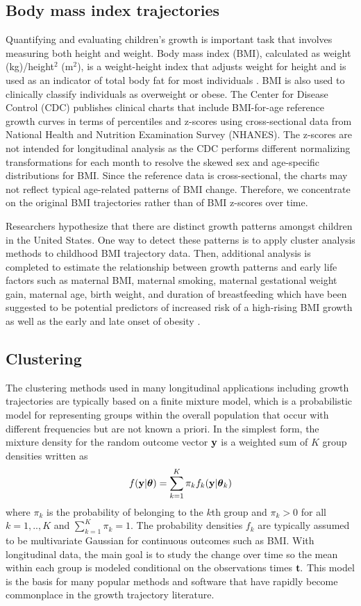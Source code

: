 \subsection{Body mass index trajectories}
Quantifying and evaluating children's growth is important task that involves measuring both height and weight. Body mass index (BMI), calculated as weight (kg)/height$^{2}$ (m$^{2}$), is a weight-height index that adjusts weight for height and is  used as an indicator of total body fat for most individuals \cite{roche1981}. BMI is also used to clinically classify individuals as overweight or obese. The Center for Disease Control (CDC) publishes clinical charts that include BMI-for-age reference growth curves in terms of percentiles and z-scores using cross-sectional data from National Health and Nutrition Examination Survey (NHANES). The z-scores are not intended for longitudinal analysis as the CDC performs different normalizing transformations for each month to resolve the skewed sex and age-specific distributions for BMI. Since the reference data is cross-sectional, the charts may not reflect typical age-related patterns of BMI change. Therefore, we concentrate on the original BMI trajectories rather than of BMI z-scores over time.

Researchers hypothesize that there are distinct growth patterns amongst children in the United States. One way to detect these patterns is to apply cluster analysis methods to childhood BMI trajectory data. Then, additional analysis is completed to estimate the relationship between growth patterns and early life factors such as maternal BMI, maternal smoking, maternal gestational weight gain, maternal age, birth weight, and duration of breastfeeding which have been suggested to be potential predictors of increased risk of a high-rising BMI growth as well as the early and late onset of obesity \cite{pryor2011,carter2012,li2007}.

\subsection{Clustering}
The clustering methods used in many longitudinal applications including growth trajectories are typically based on a finite mixture model, which is a probabilistic model for representing groups within the overall population that occur with different frequencies but are not known a priori. In the simplest form, the mixture density for the random outcome vector $\mathbf y$ is a weighted sum of $K$ group densities written as
$$f(\mathbf y|\boldsymbol\theta) = \sum^{K}_{k=1}\pi_{k}f_{k}(\mathbf y|\boldsymbol\theta_{k})$$
where $\pi_{k}$ is the probability of belonging to the $k$th group and $\pi_{k}>0$ for all $k=1,..,K$ and $\sum^{K}_{k=1}\pi_{k}=1$. The probability densities $f_{k}$ are typically assumed to be multivariate Gaussian for continuous outcomes such as BMI. With longitudinal data, the main goal is to study the change over time so the mean within each group is modeled conditional on the observations times $\mathbf t.$  This model is the basis for many popular methods and software that have rapidly become commonplace in the growth trajectory literature.

